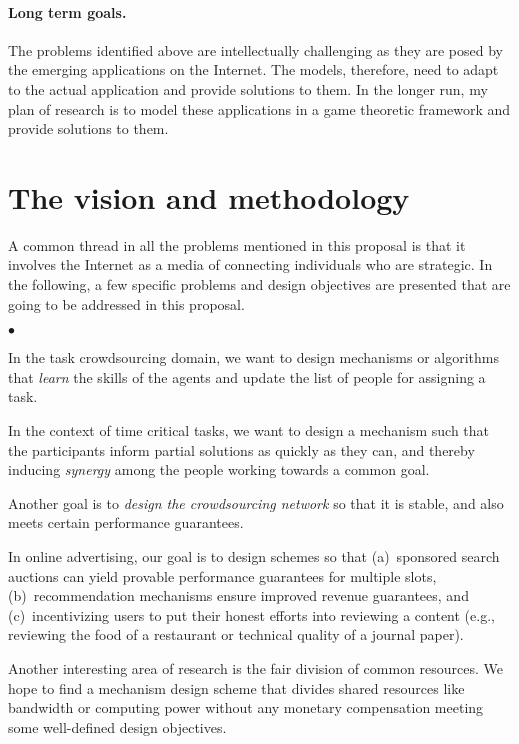 \documentclass[10pt,psfig,letter]{article}
\newcommand{\squishlisttwo}{
\begin{list}{$\bullet$}
{ \setlength{\itemsep}{0pt}
\setlength{\parsep}{0pt}
\setlength{\topsep}{0pt}
\setlength{\partopsep}{0pt}
\setlength{\leftmargin}{1em}
\setlength{\labelwidth}{1.5em}
\setlength{\labelsep}{0.5em} } }
\newcommand{\squishend}{
\end{list} }
\begin{document}
\paragraph{Long term goals.}
The problems identified above are intellectually challenging as they are posed by the emerging applications on the Internet. The models, therefore, need to adapt to the actual application and provide solutions to them. In the longer run, my plan of research is to model these applications in a game theoretic framework and provide solutions to them.


\section{The vision and methodology}

A common thread in all the problems mentioned in this proposal is that it involves the Internet as a media of connecting individuals who are strategic. In the following, a few specific problems and design objectives are presented that are going to be addressed in this proposal.

\squishlisttwo
 \item In the task crowdsourcing domain, we want to design mechanisms or algorithms that {\em learn} the skills of the agents and update the list of people for assigning a task.
 \item In the context of time critical tasks, we want to design a mechanism such that the participants inform partial solutions as quickly as they can, and thereby inducing {\em synergy} among the people working towards a common goal.
 \item Another goal is to {\em design the crowdsourcing network} so that it is stable, and also meets certain performance guarantees.
 \item In online advertising, our goal is to design schemes so that (a)~sponsored search auctions can yield provable performance guarantees for multiple slots, (b)~recommendation mechanisms ensure improved revenue guarantees, and (c)~incentivizing users to put their honest efforts into reviewing a content (e.g., reviewing the food of a restaurant or technical quality of a journal paper).
 \item Another interesting area of research is the fair division of common resources. We hope to find a mechanism design scheme that divides shared resources like bandwidth or computing power without any monetary compensation meeting some well-defined design objectives.
\squishend
\end{document}
